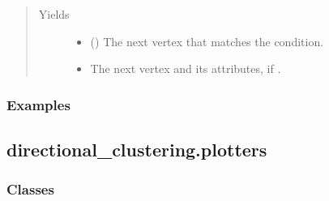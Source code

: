 \documentclass[letterpaper,10pt,english]{sphinxmanual}
\begin{document}
\begin{fulllineitems}
\begin{fulllineitems}
\begin{quote}
\begin{description}
\item[{Yields}] \leavevmode\begin{itemize}
\item {} 
 () \textendash{} The next vertex that matches the condition.

\item {} 
 \textendash{} The next vertex and its attributes, if .

\end{itemize}

\end{description}\end{quote}
\subsubsection*{Examples}

\begin{sphinxVerbatim}[commandchars=\\\{\}]
\end{sphinxVerbatim}

\end{fulllineitems}


\end{fulllineitems}

\label{\detokenize{api/directional_clustering.plotters:module-directional_clustering.plotters}}

\subsection{directional\_clustering.plotters}
\label{\detokenize{api/directional_clustering.plotters:directional-clustering-plotters}}\label{\detokenize{api/directional_clustering.plotters::doc}}

\subsubsection{Classes}
\label{\detokenize{api/directional_clustering.plotters:classes}}
\end{document}
